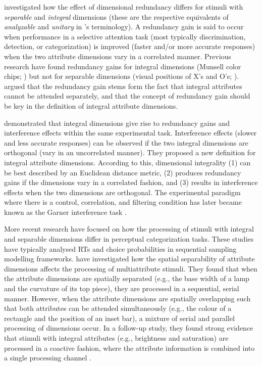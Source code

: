 \documentclass[11pt,a4paper]{article}
\begin{document}
 investigated how the effect of dimensional redundancy differs for stimuli with \textit{separable} and \textit{integral} dimensions (these are the respective equivalents of \textit{analyzable} and \textit{unitary} in \citeauthor{Shepard1964}'s terminology). A redundancy gain is said to occur when performance in a selective attention task (most typically discrimination, detection, or categorization) is improved (faster and/or more accurate responses) when the two attribute dimensions vary in a correlated manner. Previous research have found redundancy gains for integral dimensions (Munsell color chips; ) but not for separable dimensions (visual positions of X's and O's; ). \citeauthor{Lockhead1966} argued that the redundancy gain stems form the fact that integral attributes cannot be attended separately, and that the concept of redundancy gain should be key in the definition of integral attribute dimensions. 

 demonstrated that integral dimensions give rise to redundancy gains and interference effects within the same experimental task. Interference effects  (slower and less accurate responses) can be observed if the two integral dimensions are orthogonal (vary in an uncorrelated manner). They proposed a new definition for integral attribute dimensions. According to this, dimensional integrality (1) can be best described by an Euclidean distance metric, (2) produces redundancy gains if the dimensions vary in a correlated fashion, and (3) results in interference effects when the two dimensions are orthogonal. The experimental paradigm where there is a control, correlation, and filtering condition has later became known as the Garner interference task \cite{Burns2014}.

More recent research have focused on how the processing of stimuli with integral and separable dimensions differ in perceptual categorization tasks. These studies have typically analysed RTs and choice probabilities in sequential sampling modelling frameworks.  have investigated how the spatial separability of attribute dimensions affects the processing of multiattribute stimuli. They found that when the attribute dimensions are spatially separated (e.g., the base width of a lamp and the curvature of its top piece), they are processed in a sequential, serial manner. However, when the attribute dimensions are spatially overlapping such that both attributes can be attended simultaneously (e.g., the colour of a rectangle and the position of an inset bar), a mixture of serial and parallel processing of dimensions occur. In a follow-up study, they found strong evidence that stimuli with integral attributes (e.g., brightness and saturation) are processed in a coactive fashion, where the attribute information is combined into a single processing channel \cite{Littleetal2013}.
\end{document}
